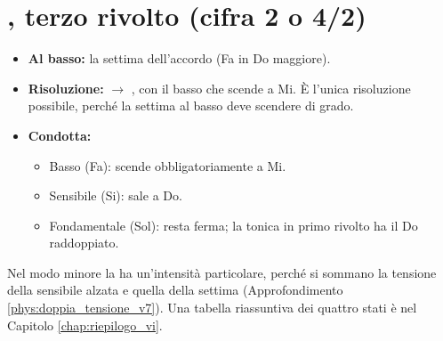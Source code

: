 \begin{esempio}
	\label{ex:v43}
\end{esempio}

\section{, terzo rivolto (cifra 2 o 4/2)}
\label{subsec:v2}
\begin{itemize}
    \item \textbf{Al basso:} la settima dell'accordo (Fa in Do maggiore).
    \item \textbf{Risoluzione:} $\rightarrow$ , con il basso che scende a Mi. È l'unica risoluzione possibile, perché la settima al basso deve scendere di grado.
    \item \textbf{Condotta:}
    \begin{itemize}
        \item Basso (Fa): scende obbligatoriamente a Mi.
        \item Sensibile (Si): sale a Do.
        \item Fondamentale (Sol): resta ferma; la tonica in primo rivolto ha il Do raddoppiato.
    \end{itemize}
\end{itemize}

\begin{esempio}
	\label{ex:v2}
\end{esempio}

Nel modo minore la  ha un'intensità particolare, perché si sommano la tensione della sensibile alzata e quella della settima (Approfondimento \ref{phys:doppia_tensione_v7}). Una tabella riassuntiva dei quattro stati è nel Capitolo \ref{chap:riepilogo_vi}.
